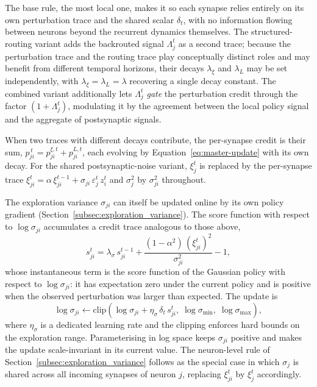     The base rule, the most local one, makes it so each synapse relies entirely on its
    own perturbation trace and the shared scalar $\delta_t$, with no information
    flowing between neurons beyond the recurrent dynamics themselves. The
    structured-routing variant adds the backrouted signal $\Lambda_j^t$ as a second
    trace; because the perturbation trace and the routing trace play conceptually
    distinct roles and may benefit from different temporal horizons, their decays
    $\lambda_\xi$ and $\lambda_L$ may be set independently, with
    $\lambda_\xi = \lambda_L = \lambda$ recovering a single decay constant. The
    combined variant additionally lets $\Lambda_j^t$ \emph{gate} the perturbation
    credit through the factor $(1 + \Lambda_j^t)$, modulating it by the agreement
    between the local policy signal and the aggregate of postsynaptic signals.
    
    When two traces with different decays contribute, the per-synapse credit is
    their sum, $p_{ji}^{\,t} = p_{ji}^{\xi,t} + p_{ji}^{L,t}$, each evolving by
    Equation~\eqref{eq:master-update} with its own decay. For the shared
    postsynaptic-noise variant, $\xi_j^t$ is replaced by the per-synapse trace
    $\xi_{ji}^t = \alpha\,\xi_{ji}^{t-1} + \sigma_{ji}\,\varepsilon_j^t\,z_i^t$ and
    $\sigma_j^2$ by $\sigma_{ji}^2$ throughout.
    
    The exploration variance $\sigma_{ji}$ can itself be updated online by its own
    policy gradient (Section~\ref{subsec:exploration_variance}). The score function
    with respect to $\log \sigma_{ji}$ accumulates a credit trace analogous to those
    above,
    \begin{equation}
    s_{ji}^t = \lambda_\sigma\, s_{ji}^{t-1}
    + \frac{(1 - \alpha^2)\,(\xi_{ji}^t)^2}{\sigma_{ji}^2} - 1,
    \label{eq:sigma-trace}
    \end{equation}
    whose instantaneous term is the score function of the Gaussian policy with
    respect to $\log \sigma_{ji}$: it has expectation zero under the current policy
    and is positive when the observed perturbation was larger than expected. The
    update is
    \begin{equation}
    \log \sigma_{ji} \leftarrow \mathrm{clip}\!\left(
    \log \sigma_{ji} + \eta_\sigma\, \delta_t\, s_{ji}^t,\;
    \log \sigma_{\min},\; \log \sigma_{\max}
    \right),
    \label{eq:sigma-update}
    \end{equation}
    where $\eta_\sigma$ is a dedicated learning rate and the clipping enforces hard
    bounds on the exploration range. Parameterising in log space keeps
    $\sigma_{ji}$ positive and makes the update scale-invariant in its current
    value. The neuron-level rule of Section~\ref{subsec:exploration_variance}
    follows as the special case in which $\sigma_j$ is shared across all incoming
    synapses of neuron $j$, replacing $\xi_{ji}^t$ by $\xi_j^t$ accordingly.

